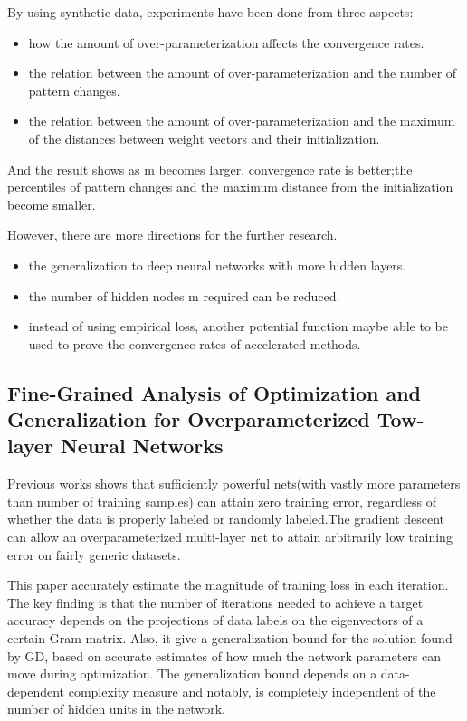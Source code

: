 \documentclass{article}
\begin{document}
By using synthetic data, experiments have been done from three aspects: 
\begin{itemize}
\item how the amount of over-parameterization affects the convergence rates.
\item the relation between the amount of over-parameterization and the number of pattern changes.
\item the relation between the amount of over-parameterization and the maximum of the distances between weight vectors and their initialization. 
\end{itemize}
And the result shows as m becomes larger, convergence rate is better;the percentiles of pattern changes and the maximum distance from the initialization become smaller.

However, there are more directions for the further research. 
\begin{itemize}
\item the generalization to deep neural networks with more hidden layers.
\item the number of hidden nodes m required can be reduced. 
\item instead of using empirical loss, another potential function maybe able to be used to prove the convergence rates of accelerated methods. 
\end{itemize}

\subsection{Fine-Grained Analysis of Optimization and Generalization for Overparameterized Tow-layer Neural Networks}
Previous works shows that sufficiently powerful nets(with vastly more parameters than number of training samples) can attain zero training error, regardless of whether the data is properly labeled or randomly labeled.The gradient descent can allow an overparameterized multi-layer net to attain arbitrarily low training error on fairly generic datasets.

This paper accurately estimate the magnitude of training loss in each iteration. The key finding is that the number of iterations needed to achieve a target accuracy depends on the projections of data labels on the eigenvectors of a certain Gram matrix. Also, it give a generalization bound for the solution found by GD, based on accurate estimates of how much the network parameters can move during optimization. The generalization bound depends on a data-dependent complexity measure and notably, is completely independent of the number of hidden units in the network.
\end{document}
